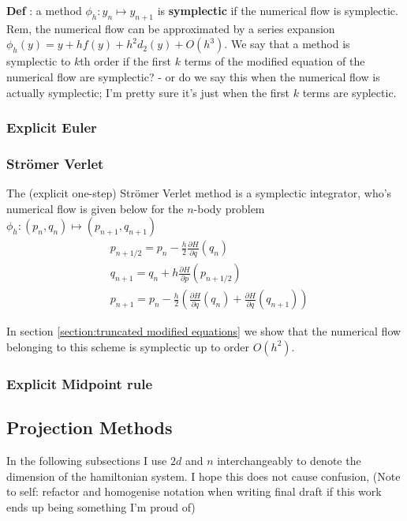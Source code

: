 \documentclass[12pt]{article}
\begin{document}
\textbf{Def} : a method $\phi_h : y_n\mapsto y_{n+1}$ is \textbf{symplectic} if the numerical flow is symplectic. Rem, the numerical flow can be approximated by a series expansion $\phi_h(y) = y + hf(y) + h^2d_2(y) + O(h^3)$. We say that a method is symplectic to $k$th order if the first $k$ terms of the modified equation of the numerical flow are symplectic? - or do we say this when the numerical flow is actually symplectic; I'm pretty sure it's just when the first $k$ terms are syplectic. 

\subsubsection{Explicit Euler}
\subsubsection{Str\"omer Verlet}
The (explicit one-step) Str\"omer Verlet method is a symplectic integrator, who's numerical flow is given below for the $n$-body problem $\phi_h : (p_n,q_n)\mapsto (p_{n+1},q_{n+1})$
\begin{equation}\label{eq:stromer verlet n body}
\begin{split}
    & p_{n+1/2} = p_n - \frac{h}{2}\frac{\partial H}{\partial q}(q_n)\\
    & q_{n+1} = q_n + h \frac{\partial H}{\partial p}(p_{n+1/2})\\
    & p_{n+1} = p_n - \frac{h}{2}\left( \frac{\partial H}{\partial q}(q_n) + \frac{\partial H}{\partial q}(q_{n+1}) \right)
\end{split}
\end{equation}

In section \ref{section:truncated modified equations} we show that the numerical flow belonging to this scheme is symplectic up to order $O(h^2)$. 

\subsubsection{Explicit Midpoint rule}


\subsection{Projection Methods}

In the following subsections I use $2d$ and $n$ interchangeably to denote the dimension of the hamiltonian system. I hope this does not cause confusion, (Note to self: refactor and homogenise notation when writing final draft if this work ends up being something I'm proud of) 
\end{document}
